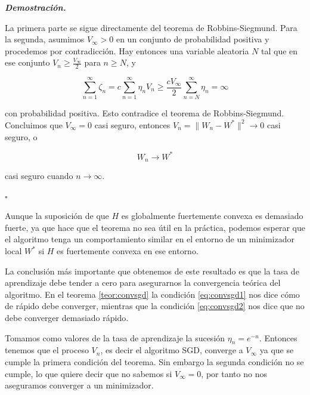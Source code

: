 \begin{flushleft}
   \textbf{\textit{Demostración.}}
\end{flushleft} 

La primera parte se sigue directamente del teorema de Robbins-Siegmund. Para la segunda, asumimos $V_{\infty} > 0 $ en un conjunto de probabilidad positiva y procedemos por contradicción. Hay entonces una variable aleatoria $N$ tal que en ese conjunto $V_n \geq \frac{V_{\infty}}{2}$ para $n \geq N$, y 

\begin{equation*}
	\sum_{n=1}^{\infty} \zeta _n = c \sum_{n=1}^{\infty} \eta _n V_n \geq \frac{cV_{\infty}}{2} \sum_{n=N}^{\infty} \eta _n = \infty
\end{equation*}

con probabilidad positiva. Esto contradice el teorema de Robbins-Siegmund. Concluimos que $V_{\infty}=0$ casi seguro, entonces $V_n= \| W_n - W^* \| ^2 \rightarrow 0$ casi seguro, o 

\begin{equation*}
	W_n \rightarrow W^*
\end{equation*}

casi seguro cuando $n \rightarrow \infty$.
\begin{flushright}
    $\square$
\end{flushright} 

Aunque la suposición de que $H$ es globalmente fuertemente convexa es demasiado fuerte, ya que hace que el teorema no sea útil en la práctica, podemos esperar que el algoritmo tenga un comportamiento similar en el entorno de un minimizador local $W^*$ si $H$ es fuertemente convexa en ese entorno.

La conclusión más importante que obtenemos de este resultado es que la tasa de aprendizaje debe tender a cero para asegurarnos la convergencia teórica del algoritmo. En el teorema \ref{teor:convsgd} la condición \ref{eq:convsgd1} nos dice cómo de rápido debe converger, mientras que la condición \ref{eq:convsgd2} nos dice que no debe converger demasiado rápido.

\begin{ejemplo}
	Tomamos como valores de la tasa de aprendizaje la sucesión $\eta _n = e^{-n}$. Entonces tenemos que el proceso $V_n$, es decir el algoritmo SGD, converge a $V_{\infty}$ ya que se cumple la primera condición del teorema. Sin embargo la segunda condición no se cumple, lo que quiere decir que no sabemos si $V_{\infty}=0$, por tanto no nos aseguramos converger a un minimizador. 
\end{ejemplo}


